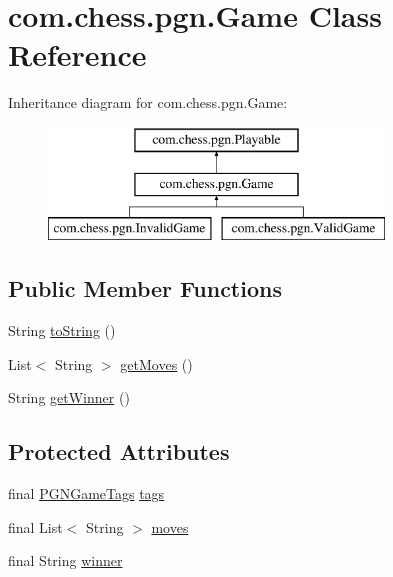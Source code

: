 \hypertarget{classcom_1_1chess_1_1pgn_1_1_game}{}\section{com.\+chess.\+pgn.\+Game Class Reference}
\label{classcom_1_1chess_1_1pgn_1_1_game}
Inheritance diagram for com.\+chess.\+pgn.\+Game\+:\begin{figure}[H]
\begin{center}
\leavevmode
\includegraphics[height=3.000000cm]{classcom_1_1chess_1_1pgn_1_1_game}
\end{center}
\end{figure}
\subsection*{Public Member Functions}
\begin{DoxyCompactItemize}
\item 
String \mbox{\hyperlink{classcom_1_1chess_1_1pgn_1_1_game_a34a321652e30bcfd0ad76f8de0dcd17f}{to\+String}} ()
\item 
List$<$ String $>$ \mbox{\hyperlink{classcom_1_1chess_1_1pgn_1_1_game_a15a88c8d5059e4b66eacf2fa7d9c6ae8}{get\+Moves}} ()
\item 
String \mbox{\hyperlink{classcom_1_1chess_1_1pgn_1_1_game_a89b481b914620c22797caed7617b3b23}{get\+Winner}} ()
\end{DoxyCompactItemize}
\subsection*{Protected Attributes}
\begin{DoxyCompactItemize}
\item 
final \mbox{\hyperlink{classcom_1_1chess_1_1pgn_1_1_p_g_n_game_tags}{P\+G\+N\+Game\+Tags}} \mbox{\hyperlink{classcom_1_1chess_1_1pgn_1_1_game_aadfd202e33d988f6c6520ffea05908c6}{tags}}
\item 
final List$<$ String $>$ \mbox{\hyperlink{classcom_1_1chess_1_1pgn_1_1_game_a0aacc9d7cc963a7f7c6bb019f2799a2a}{moves}}
\item 
final String \mbox{\hyperlink{classcom_1_1chess_1_1pgn_1_1_game_aaf5bc106d4dda4f0a2f79e7a18c55e63}{winner}}
\end{DoxyCompactItemize}
